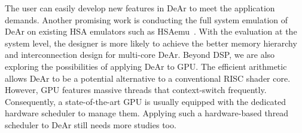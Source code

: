 The user can easily develop new features in DeAr to meet the application demands.
Another promising work is conducting the full system emulation of DeAr on existing HSA emulators such as HSAemu~\cite{hsaemu}.
With the evaluation at the system level, the designer is more likely to achieve the better memory hierarchy and interconnection design for multi-core DeAr.
Beyond DSP, we are also exploring the possibilities of applying DeAr to GPU.
The efficient arithmetic allows DeAr to be a potential alternative to a conventional RISC shader core.
However, GPU features massive threads that context-switch frequently.
Consequently, a state-of-the-art GPU is usually equipped with the dedicated hardware scheduler to manage them.
Applying such a hardware-based thread scheduler to DeAr still needs more studies too.


